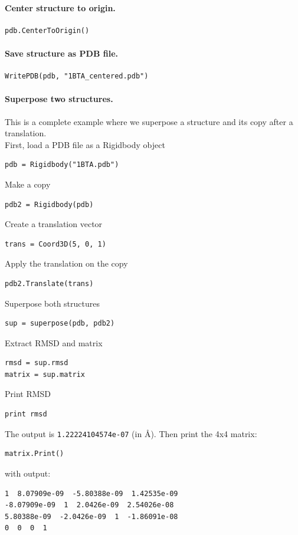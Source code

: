 \documentclass[12pt,a4paper]{article}
\begin{document}
\paragraph{Center structure to origin.}
\begin{verbatim}
pdb.CenterToOrigin()
\end{verbatim}


\paragraph{Save structure as PDB file.}
\begin{verbatim}
WritePDB(pdb, "1BTA_centered.pdb")
\end{verbatim}


\paragraph{Superpose two structures.} This is a complete example where we
superpose a structure and its copy after a translation.\\

\noindent
First, load a PDB file as a Rigidbody object
\begin{verbatim}
pdb = Rigidbody("1BTA.pdb")
\end{verbatim}
Make a copy
\begin{verbatim}
pdb2 = Rigidbody(pdb)
\end{verbatim}
Create a translation vector
\begin{verbatim}
trans = Coord3D(5, 0, 1)
\end{verbatim}
Apply the translation on the copy
\begin{verbatim}
pdb2.Translate(trans)
\end{verbatim}
Superpose both structures
\begin{verbatim}
sup = superpose(pdb, pdb2)
\end{verbatim}
Extract RMSD and matrix
\begin{verbatim}
rmsd = sup.rmsd
matrix = sup.matrix
\end{verbatim}
Print RMSD
\begin{verbatim}
print rmsd
\end{verbatim}
The output is {\tt 1.22224104574e-07} (in \AA). Then print the 4x4 matrix:
\begin{verbatim}
matrix.Print()
\end{verbatim}
with output:
\begin{verbatim}
1  8.07909e-09  -5.80388e-09  1.42535e-09  
-8.07909e-09  1  2.0426e-09  2.54026e-08  
5.80388e-09  -2.0426e-09  1  -1.86091e-08  
0  0  0  1  
\end{verbatim}
\end{document}
